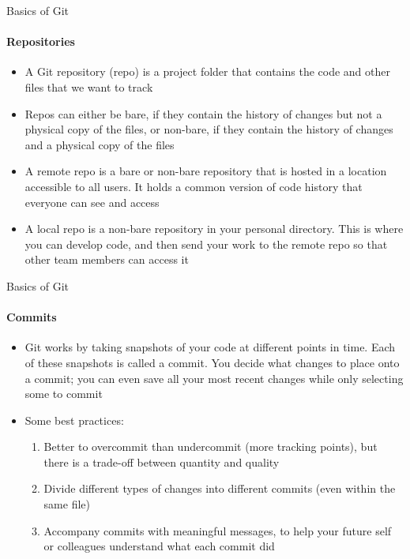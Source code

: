 \documentclass[10pt, aspectratio=169, xcolor=dvipsnames]{beamer}
\let\olditem\item
\renewcommand{\item}{%
\olditem\vspace{0.3em}}
\begin{document}
\begin{frame}[t]{Basics of Git}
    \framesubtitle{Repositories}

    \normalsize\vspace{0.5em}
    \begin{itemize}
        \item A Git repository (repo) is a project folder that contains the code and other files that we want to track
        \item Repos can either be \alert{bare}, if they contain the history of changes but not a physical copy of the files, or \alert{non-bare}, if they contain the history of changes and a physical copy of the files
        \item A \alert{remote} repo is a bare or non-bare repository that is hosted in a location accessible to all users. It holds a common version of code history that everyone can see and access
        \item A \alert{local} repo is a non-bare repository in your personal directory. This is where you can develop code, and then send your work to the remote repo so that other team members can access it
    \end{itemize}
\end{frame}

\begin{frame}[t]{Basics of Git}
    \framesubtitle{Commits}

    \normalsize\vspace{0.5em}
    \begin{itemize}
        \item Git works by taking snapshots of your code at different points in time. Each of these snapshots is called a \alert{commit}. You decide what changes to place onto a commit; you can even save all your most recent changes while only selecting some to commit
        \item Some best practices:
        \begin{enumerate}
            \item Better to overcommit than undercommit (more tracking points), but there is a trade-off between quantity and quality
            \item Divide different types of changes into different commits (even within the same file)
            \item Accompany commits with meaningful messages, to help your future self or colleagues understand what each commit did
        \end{enumerate}
    \end{itemize}
\end{frame}
\end{document}
